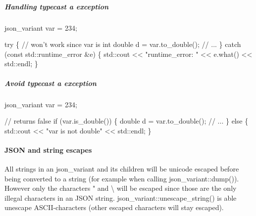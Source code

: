 \subparagraph*{\label{_handling_typecast_expception_section}%
Handling typecast a exception}


\begin{DoxyCode}
json\_variant var = 234;

\textcolor{keywordflow}{try} \{
    \textcolor{comment}{// won't work since var is int}
    \textcolor{keywordtype}{double} d = var.to\_double();  
    \textcolor{comment}{// ...}
\}
\textcolor{keywordflow}{catch} (\textcolor{keyword}{const} std::runtime\_error &e) \{
    std::cout << \textcolor{stringliteral}{"runtime\_error: "} << e.what() << std::endl;   
\} 
\end{DoxyCode}


\subparagraph*{\label{_avoid_typecast_exception_section}%
Avoid typecast a exception}


\begin{DoxyCode}
json\_variant var = 234;

\textcolor{comment}{// returns false}
\textcolor{keywordflow}{if} (var.is\_double()) \{
    \textcolor{keywordtype}{double} d = var.to\_double();   
    \textcolor{comment}{// ...}
\}
\textcolor{keywordflow}{else} \{
    std::cout << \textcolor{stringliteral}{"var is not double"} << std::endl;   
\}
\end{DoxyCode}


\paragraph*{\label{_json_and_string_escapes_section}%
J\+S\+ON and string escapes}

All strings in an {\ttfamily json\+\_\+variant} and its children will be unicode escaped before being converted to a string (for example when calling {\ttfamily json\+\_\+variant\+::dump()}). However only the characters " and \textbackslash{} will be escaped since those are the only illegal characters in an J\+S\+ON string. json\+\_\+variant\+::unescape\+\_\+string() is able unescape A\+S\+C\+I\+I-\/characters (other escaped characters will stay escaped).


